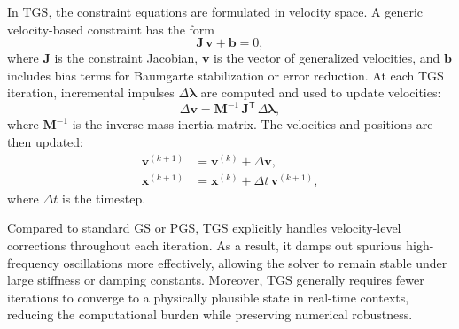 \documentclass[12pt,twoside,letterpaper]{article}
\begin{document}
In TGS, the constraint equations are formulated in velocity space. A generic velocity-based constraint has the form
\begin{equation}
  \mathbf{J}\,\mathbf{v} + \mathbf{b} = 0,
  \label{eq:tgs_constraint}
\end{equation}
where \(\mathbf{J}\) is the constraint Jacobian, \(\mathbf{v}\) is the vector of generalized velocities, and \(\mathbf{b}\) includes bias terms for Baumgarte stabilization or error reduction. At each TGS iteration, incremental impulses \(\Delta \boldsymbol{\lambda}\) are computed and used to update velocities:
\begin{equation}
  \Delta \mathbf{v} = \mathbf{M}^{-1}\,\mathbf{J}^\mathsf{T}\,\Delta \boldsymbol{\lambda},
  \label{eq:tgs_velocity_update}
\end{equation}
where \(\mathbf{M}^{-1}\) is the inverse mass-inertia matrix. The velocities and positions are then updated:
\begin{align}
  \mathbf{v}^{(k+1)} &= \mathbf{v}^{(k)} + \Delta \mathbf{v}, \\
  \mathbf{x}^{(k+1)} &= \mathbf{x}^{(k)} + \Delta t\,\mathbf{v}^{(k+1)},
  \label{eq:tgs_position_update}
\end{align}
where \(\Delta t\) is the timestep. 

Compared to standard GS or PGS, TGS explicitly handles velocity-level corrections throughout each iteration. As a result, it damps out spurious high-frequency oscillations more effectively, allowing the solver to remain stable under large stiffness or damping constants. Moreover, TGS generally requires fewer iterations to converge to a physically plausible state in real-time contexts, reducing the computational burden while preserving numerical robustness.


\end{document}

